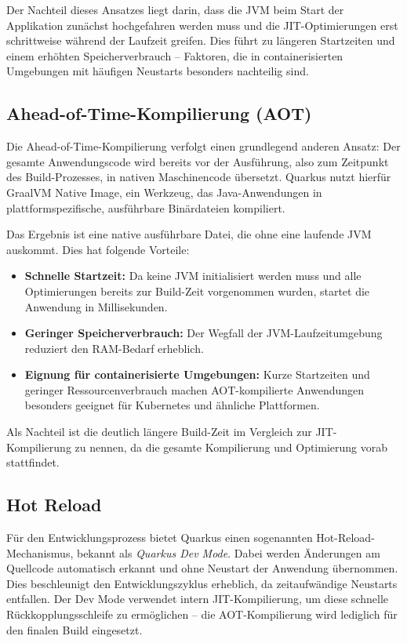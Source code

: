 Der Nachteil dieses Ansatzes liegt darin, dass die JVM beim Start der Applikation 
zunächst hochgefahren werden muss und die JIT-Optimierungen erst schrittweise während 
der Laufzeit greifen. Dies führt zu längeren Startzeiten und einem erhöhten 
Speicherverbrauch – Faktoren, die in containerisierten Umgebungen mit häufigen 
Neustarts besonders nachteilig sind.

\subsection{Ahead-of-Time-Kompilierung (AOT)}

Die Ahead-of-Time-Kompilierung verfolgt einen grundlegend anderen Ansatz: Der gesamte 
Anwendungscode wird bereits vor der Ausführung, also zum Zeitpunkt des Build-Prozesses, 
in nativen Maschinencode übersetzt. Quarkus nutzt hierfür GraalVM Native Image, ein 
Werkzeug, das Java-Anwendungen in plattformspezifische, ausführbare Binärdateien 
kompiliert.

Das Ergebnis ist eine native ausführbare Datei, die ohne eine laufende JVM auskommt. 
Dies hat folgende Vorteile:

\begin{itemize}
    \item \textbf{Schnelle Startzeit:} Da keine JVM initialisiert werden muss und alle 
    Optimierungen bereits zur Build-Zeit vorgenommen wurden, startet die Anwendung 
    in Millisekunden.
    \item \textbf{Geringer Speicherverbrauch:} Der Wegfall der JVM-Laufzeitumgebung 
    reduziert den RAM-Bedarf erheblich.
    \item \textbf{Eignung für containerisierte Umgebungen:} Kurze Startzeiten und 
    geringer Ressourcenverbrauch machen AOT-kompilierte Anwendungen besonders 
    geeignet für Kubernetes und ähnliche Plattformen.
\end{itemize}

Als Nachteil ist die deutlich längere Build-Zeit im Vergleich zur JIT-Kompilierung 
zu nennen, da die gesamte Kompilierung und Optimierung vorab stattfindet.

\subsection{Hot Reload}

Für den Entwicklungsprozess bietet Quarkus einen sogenannten Hot-Reload-Mechanismus, 
bekannt als \textit{Quarkus Dev Mode}. Dabei werden Änderungen am Quellcode automatisch 
erkannt und ohne Neustart der Anwendung übernommen. Dies beschleunigt den 
Entwicklungszyklus erheblich, da zeitaufwändige Neustarts entfallen. Der Dev Mode 
verwendet intern JIT-Kompilierung, um diese schnelle Rückkopplungsschleife zu 
ermöglichen – die AOT-Kompilierung wird lediglich für den finalen Build eingesetzt.


